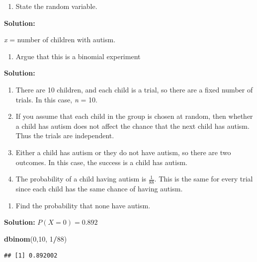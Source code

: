 \documentclass[]{book}
\newenvironment{Shaded}{\begin{snugshade}}{\end{snugshade}}
\newcommand{\DecValTok}[1]{\textcolor[rgb]{0.00,0.00,0.81}{#1}}
\newcommand{\KeywordTok}[1]{\textcolor[rgb]{0.13,0.29,0.53}{\textbf{#1}}}
\newcommand{\NormalTok}[1]{#1}
\newcommand{\OperatorTok}[1]{\textcolor[rgb]{0.81,0.36,0.00}{\textbf{#1}}}
\providecommand{\tightlist}{%
  \setlength{\itemsep}{0pt}\setlength{\parskip}{0pt}}
\begin{document}
\begin{enumerate}
\def\labelenumi{\alph{enumi}.}
\tightlist
\item
  State the random variable.
\end{enumerate}

\textbf{Solution:}

\emph{x} = number of children with autism.

\begin{enumerate}
\def\labelenumi{\alph{enumi}.}
\setcounter{enumi}{1}
\tightlist
\item
  Argue that this is a binomial experiment
\end{enumerate}

\textbf{Solution:}

\begin{enumerate}
\def\labelenumi{\arabic{enumi}.}
\item
  There are 10 children, and each child is a trial, so there are a fixed number of trials. In this case, \emph{n} = 10.
\item
  If you assume that each child in the group is chosen at random, then whether a child has autism does not affect the chance that the next child has autism. Thus the trials are independent.
\item
  Either a child has autism or they do not have autism, so there are two outcomes. In this case, the success is a child has autism.
\item
  The probability of a child having autism is \(\frac{1}{88}\). This is the same for every trial since each child has the same chance of having autism.
\end{enumerate}

\begin{enumerate}
\def\labelenumi{\alph{enumi}.}
\setcounter{enumi}{2}
\tightlist
\item
  Find the probability that none have autism.
\end{enumerate}

\textbf{Solution:}
\(P(X=0)=0.892\)

\begin{Shaded}
\begin{Highlighting}[]
\KeywordTok{dbinom}\NormalTok{(}\DecValTok{0}\NormalTok{,}\DecValTok{10}\NormalTok{, }\DecValTok{1}\OperatorTok{/}\DecValTok{88}\NormalTok{)}
\end{Highlighting}
\end{Shaded}

\begin{verbatim}
## [1] 0.892002
\end{verbatim}
\end{document}
